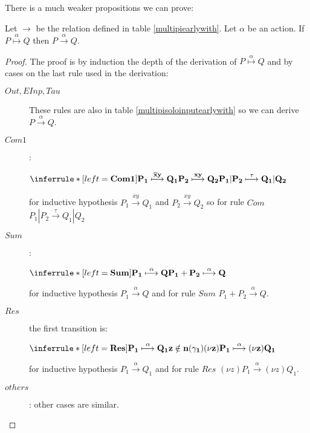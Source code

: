 There is a much weaker propositions we can prove:
\begin{proposition}
  Let $\rightarrow$ be the relation defined in table \ref{multipiearlywith}. Let $\alpha$ be an action. If $P \stackrel{\alpha}{\longmapsto} Q$ then $P\xrightarrow{\alpha} Q$.
  \begin{proof}
    The proof is by induction the depth of the derivation of $P \stackrel{\alpha}{\longmapsto} Q$ and by cases on the last rule used in the derivation:
    \begin{description}
      \item[$Out, EInp, Tau$]
	These rules are also in table \ref{multipisoloinputearlywith} so we can derive $P\xrightarrow{\alpha} Q$. 
      \item[$Com1$]:
	\begin{center}
	  $\inferrule* [left=\bf{Com1}]{
	    P_{1} \stackrel{\overline{x}y}{\longmapsto} Q_{1}
	  \\
	    P_{2} \stackrel{xy}{\longmapsto} Q_{2}
	  }{
	    P_{1}|P_{2} \stackrel{\tau}{\longmapsto} Q_{1}|Q_{2}
	  }$ 
	\end{center}
	for inductive hypothesis $P_{1} \xrightarrow{\overline{x}y} Q_{1}$ and $P_{2} \xrightarrow{xy} Q_{2}$ so for rule $Com$ $P_{1}|P_{2} \xrightarrow{\tau} Q_{1}|Q_{2}$
      \item[$Sum$]:
	\begin{center}
	  $\inferrule* [left=\bf{Sum}]{
	    P_{1} \stackrel{\alpha}{\longmapsto} Q
	  }{
	    P_{1}+P_{2} \stackrel{\alpha}{\longmapsto} Q
	  }$ 
	\end{center}
	for inductive hypothesis $P_{1} \xrightarrow{\alpha} Q$ and for rule $Sum$ $P_{1}+P_{2} \xrightarrow{\alpha} Q$.
      \item[$Res$] the first transition is:
	\begin{center}
	  $\inferrule* [left=\bf{Res}]{
	      P_{1} \stackrel{\alpha}{\longmapsto} Q_{1}
	    \\
	      z\notin n(\gamma_{1})
	  }{
	    (\nu z) P_{1} \stackrel{\alpha}{\longmapsto} (\nu z)Q_{1}
	  }$ 
	\end{center}		
	for inductive hypothesis $P_{1} \xrightarrow{\alpha} Q_{1}$ and for rule $Res$ $(\nu z)P_{1} \xrightarrow{\alpha} (\nu z)Q_{1}$.
      \item[$others$]: other cases are similar.
    \end{description}	    
  \end{proof}
\end{proposition}


